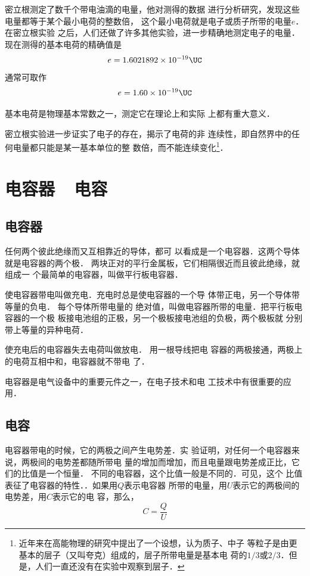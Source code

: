 密立根测定了数千个带电油滴的电量，他对测得的数据
进行分析研究，发现这些电量都等于某个最小电荷的整数倍，
这个最小电荷就是电子或质子所带的电量$e$．在密立根实验
之后，人们还做了许多其他实验，进一步精确地测定电子的电量．
现在测得的基本电荷的精确值是
\[e=1.6021892\times10^{-19} \UC \]
通常可取作
\[e=1.60\times10^{-19} \UC \]

基本电荷是物理基本常数之一，测定它在理论上和实际
上都有重大意义．

密立根实验进一步证实了电子的存在，揭示了电荷的非
连续性，即自然界中的任何电量都只能是某一基本单位的整
数倍，而不能连续变化\footnote{近年来在高能物理的研究中提出了一个设想，认为质子、中子
等粒子是由更基本的层子（又叫夸克）组成的，层子所带电量是基本电
荷的$1/3$或$2/3$．但是，人们一直还没有在实验中观察到层子．}．

\section{电容器~~电容}
\subsection{电容器}
任何两个彼此绝缘而又互相靠近的导体，都可
以看成是一个电容器．这两个导体就是电容器的两个极．
两块正对的平行金属板，它们相隔很近而且彼此绝缘，就组成一
个最简单的电容器，叫做平行板电容器．

使电容器带电叫做充电．充电时总是使电容器的一个导
体带正电，另一个导体带等量的负电．
每个导体所带电量的
绝对值，叫做电容器所带的电量．把平行板电容器的一个极
板接电池组的正极，另一个极板接电池组的负极，两个极板就
分别带上等量的异种电荷．

使充电后的电容器失去电荷叫做放电．
用一根导线把电
容器的两极接通，两极上的电荷互相中和，电容器就不带电
了．

电容器是电气设备中的重要元件之一，在电子技术和电
工技术中有很重要的应用．

\subsection{电容}
电容器带电的时候，它的两极之间产生电势差．实
验证明，对任何一个电容器来说，两极间的电势差都随所带电
量的增加而增加，而且电量跟电势差成正比，它们的比值是一个恒量．
不同的电容器，这个比值一般是不同的．可见，这个
比值表征了电容器的特性．．如果用$Q$表示电容器
所带的电量，用$U$表示它的两极间的电势差，用$C$表示它的电
容，那么，
\[C=\frac{Q}{U} \]

